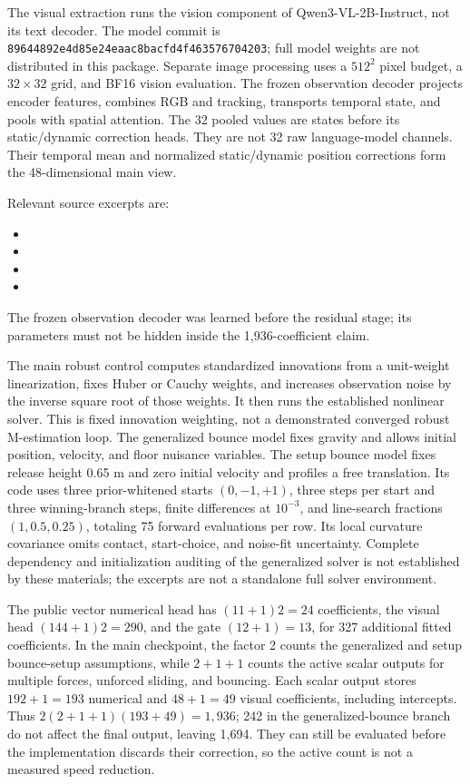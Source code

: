 \documentclass[11pt]{article}
\begin{document}
The visual extraction runs the vision component of Qwen3-VL-2B-Instruct, not its text decoder. The model commit is \texttt{89644892e4d85e24eaac8bacfd4f463576704203}; full model weights are not distributed in this package. Separate image processing uses a $512^2$ pixel budget, a $32\times32$ grid, and BF16 vision evaluation. The frozen observation decoder projects encoder features, combines RGB and tracking, transports temporal state, and pools with spatial attention. The 32 pooled values are states before its static/dynamic correction heads. They are not 32 raw language-model channels. Their temporal mean and normalized static/dynamic position corrections form the 48-dimensional main view.

Relevant source excerpts are:
\begin{itemize}
\item {}
\item {}
\item {}
\item {}
\end{itemize}
The frozen observation decoder was learned before the residual stage; its parameters must not be hidden inside the 1,936-coefficient claim.

The main robust control computes standardized innovations from a unit-weight linearization, fixes Huber or Cauchy weights, and increases observation noise by the inverse square root of those weights. It then runs the established nonlinear solver. This is fixed innovation weighting, not a demonstrated converged robust M-estimation loop. The generalized bounce model fixes gravity and allows initial position, velocity, and floor nuisance variables. The setup bounce model fixes release height 0.65 m and zero initial velocity and profiles a free translation. Its code uses three prior-whitened starts $(0,-1,+1)$, three steps per start and three winning-branch steps, finite differences at $10^{-3}$, and line-search fractions $(1,0.5,0.25)$, totaling 75 forward evaluations per row. Its local curvature covariance omits contact, start-choice, and noise-fit uncertainty. Complete dependency and initialization auditing of the generalized solver is not established by these materials; the excerpts are not a standalone full solver environment.

The public vector numerical head has $(11+1)2=24$ coefficients, the visual head $(144+1)2=290$, and the gate $(12+1)=13$, for 327 additional fitted coefficients. In the main checkpoint, the factor 2 counts the generalized and setup bounce-setup assumptions, while $2+1+1$ counts the active scalar outputs for multiple forces, unforced sliding, and bouncing. Each scalar output stores $192+1=193$ numerical and $48+1=49$ visual coefficients, including intercepts. Thus $2(2+1+1)(193+49)=1,936$; 242 in the generalized-bounce branch do not affect the final output, leaving 1,694. They can still be evaluated before the implementation discards their correction, so the active count is not a measured speed reduction.
\end{document}
